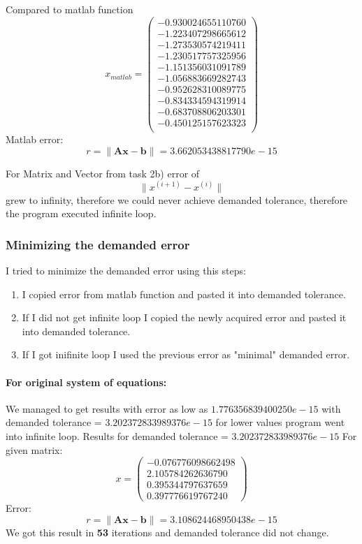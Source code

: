 \documentclass[12pt]{report}
\begin{document}
Compared to matlab function
\[ x_{matlab} = \left( \begin{array}{cc}
  -0.930024655110760 \\
  -1.223407298665612 \\
  -1.273530574219411 \\
  -1.230517757325956 \\
  -1.151356031091789 \\
  -1.056883669282743 \\
  -0.952628310089775 \\
  -0.834334594319914 \\
  -0.683708806203301 \\
  -0.450125157623323 \\
\end{array} \right)
\]
Matlab error:
\[ r = \| \mathbf{A}\mathbf{x} - \mathbf{b}\| = 3.662053438817790e-15 \]

For Matrix and Vector from task 2b) error of
\[ \| x^{(i+1)} - x^{(i)} \| \]
grew to infinity, therefore we could never achieve demanded tolerance, therefore the program executed infinite loop.

\subsubsection{Minimizing the demanded error}
I tried to minimize the demanded error using this steps:
\begin{enumerate}
\item I copied error from matlab function and pasted it into demanded tolerance.
\item If I did not get infinite loop I copied the newly acquired error and pasted it into demanded tolerance.
\item If I got inifinite loop I used the previous error as "minimal" demanded error.
\end{enumerate}
\newpage
\paragraph{For original system of equations:}
We managed to get results with error as low as $1.776356839400250e-15$ with demanded tolerance = $3.202372833989376e-15$ for lower values program went into infinite loop.
Results for demanded tolerance = $3.202372833989376e-15$
For given matrix:
\[ x = \left( \begin{array}{cc}
  -0.076776098662498 \\
   2.105784262636790 \\
   0.395344797637659 \\
   0.397776619767240
\end{array} \right)
\]
Error:
\[ r = \| \mathbf{A}\mathbf{x} - \mathbf{b}\| = 3.108624468950438e-15 \]
We got this result in \textbf{53} iterations and demanded tolerance did not change.
\end{document}
